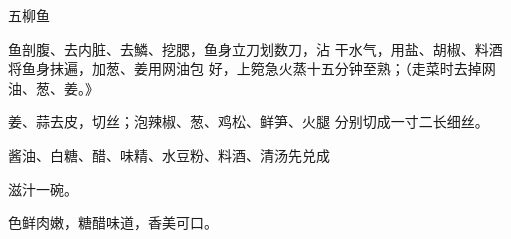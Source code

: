 \begin{recipe}{五柳鱼}

\ingredients


\cooking

\step 	鱼剖腹、去内脏、去鱗、挖腮，鱼身立刀划数刀，沾 干水气，用盐、胡椒、料酒将鱼身抹遍，加葱、姜用网油包 好，上箢急火蒸十五分钟至熟；（走菜时去掉网油、葱、姜。》

\step 	姜、蒜去皮，切丝；泡辣椒、葱、鸡松、鲜笋、火腿 分别切成一寸二长细丝。

\step 	酱油、白糖、醋、味精、水豆粉、料酒、清汤先兑成

滋汁一碗。

\notes

色鲜肉嫩，糖醋味道，香美可口。

\end{recipe}

